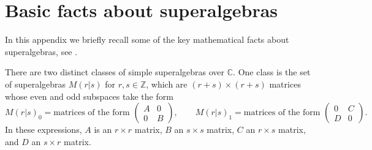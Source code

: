 \documentclass[12pt,a4paper]{article}
\newcommand{\zz}{\mathbb{Z}}
\newcommand{\cc}{\mathbb{C}}
\newcommand\be            {\begin{equation}}
\newcommand\ee            {\end{equation}}
\newcommand{\PsiEnd}{\mathord{\vcenter{\hbox{\texttt{[image: PsiEnd.pdf]}}}}}
\newcommand{\PsiEndExchange}{\mathord{\vcenter{\hbox{\texttt{[image: PsiEndExchange.pdf]}}}}}
\begin{document}

\section{Basic facts about superalgebras} \label{superstuff}

In this appendix we briefly recall some of the key mathematical facts about superalgebras, see \cite{jozefiak1988}.

There are two distinct classes of simple superalgebras over $\cc$. One class is the set of superalgebras $M(r|s)$ for $r,s\in\zz$, which are $(r+s)\times(r+s)$ matrices whose even and odd subspaces take the form
\be M(r|s)_0 = \text{matrices of the form\ } \begin{pmatrix} A & 0 \\ 0 & B \end{pmatrix},\qquad M(r|s)_1 = \text{matrices of the form\ } \begin{pmatrix} 0 & C \\ D & 0 \end{pmatrix}.\ee
In these expressions, $A$ is an $r\times r$ matrix, $B$ an $s\times s$ matrix, $C$ an $r\times s$ matrix, and $D$ an $s\times r$ matrix. 
\end{document}
